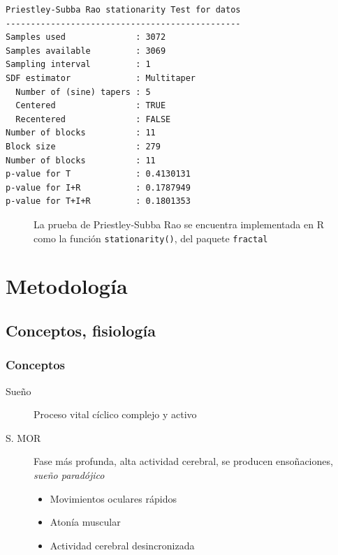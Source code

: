 \documentclass{beamer}
\begin{document}

\begin{lrbox}{\mybox}%
\begin{lstlisting}[caption={}]
Priestley-Subba Rao stationarity Test for datos
-----------------------------------------------
Samples used              : 3072 
Samples available         : 3069 
Sampling interval         : 1 
SDF estimator             : Multitaper 
  Number of (sine) tapers : 5 
  Centered                : TRUE 
  Recentered              : FALSE 
Number of blocks          : 11 
Block size                : 279 
Number of blocks          : 11 
p-value for T             : 0.4130131 
p-value for I+R           : 0.1787949 
p-value for T+I+R         : 0.1801353 
\end{lstlisting}
\end{lrbox}%

\begin{frame}[fragile]
\begin{figure}
\scalebox{0.8}{\usebox{\mybox}}
\caption{La prueba de Priestley-Subba Rao se encuentra implementada en R como la funci\'on 
\texttt{stationarity()}, del paquete \texttt{fractal}}
\end{figure}
\end{frame}


\section{Metodolog\'ia}


\subsection{Conceptos, fisiolog\'ia}

\begin{frame}
\frametitle{Conceptos}
\begin{description}
\item[Sue\~no] Proceso vital c\'iclico complejo y activo
\item[S. MOR] Fase m\'as profunda, alta actividad cerebral, se producen enso\~naciones, 
\textit{sue\~no parad\'ojico}
\begin{itemize}
\item Movimientos oculares r\'apidos
\item Aton\'ia muscular
\item Actividad cerebral desincronizada
\end{itemize}
\end{description}
\end{frame}
\end{document}
